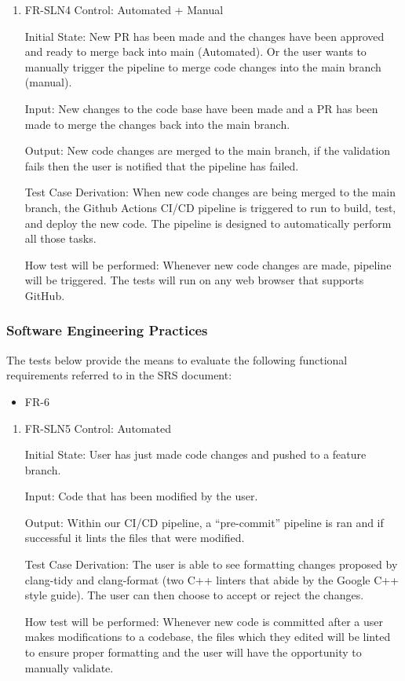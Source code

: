 \documentclass[12pt, titlepage]{article}
\begin{document}
\begin{enumerate}
  \item{FR-SLN4}
  Control: Automated + Manual
            
  Initial State: New PR has been made and the changes have been approved and ready to merge back into main (Automated). Or the user wants to manually trigger the pipeline to merge code changes into the main branch (manual). 
            
  Input: New changes to the code base have been made and a PR has been made to merge the changes back into the main branch.
            
  Output: New code changes are merged to the main branch, if the validation fails then the user is notified that the pipeline has failed.

  Test Case Derivation: When new code changes are being merged to the main branch, the Github Actions CI/CD pipeline is triggered to run to build, test, and deploy the new code. The pipeline is designed to automatically perform all those tasks.
            
  How test will be performed: Whenever new code changes are made, pipeline will be triggered. The tests will run on any web browser that supports GitHub.

\end{enumerate}

\subsubsection{Software Engineering Practices}
The tests below provide the means to evaluate the following functional requirements referred to in the SRS document:
\begin{itemize}
  \item FR-6
\end{itemize}

\begin{enumerate}
  \item{FR-SLN5}
  Control: Automated
            
  Initial State: User has just made code changes and pushed to a feature branch.
            
  Input: Code that has been modified by the user.
            
  Output: Within our CI/CD pipeline, a “pre-commit” pipeline is ran and if successful it lints the files that were modified.
  
  Test Case Derivation: The user is able to see formatting changes proposed by clang-tidy and clang-format (two C++ linters that abide by the Google C++ style guide). The user can then choose to accept or reject the changes.
            
  How test will be performed: Whenever new code is committed after a user makes modifications to a codebase, the files which they edited will be linted to ensure proper formatting and the user will have the opportunity to manually validate.
\end{enumerate}
\end{document}
